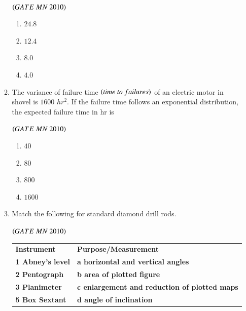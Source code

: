 \documentclass{article}
\begin{document}
\begin{enumerate}[label=Q.\arabic*., itemsep=1em, leftmargin=0pt, itemindent=*, labelsep=0.5em]
\begin{enumerate}[label=Q.\arabic*., start=17, leftmargin=2em]
\\
\begin{flushright}
\hfill$\left(GATE\ MN\ 2010\right)$
\end{flushright}
\begin{multicols}{4}
\begin{enumerate}[label=(\Alph*),leftmargin=4em]
\item $24.8$
\item $12.4$
\item $8.0$
\item $4.0$
\end{enumerate}
\end{multicols}
\bigskip
\item The variance of failure time $\left(time\ to\ failures\right)$ of an electric motor in shovel is $1600$ $hr^2$. If the
failure time follows an exponential distribution, the expected failure time in hr is
\\
\begin{flushright}
\hfill$\left(GATE\ MN\ 2010\right)$
\end{flushright}
\begin{multicols}{4}
\begin{enumerate}[label=(\Alph*),leftmargin=4em]
\item $40$
\item $80$
\item $800$
\item $1600$
\end{enumerate}
\end{multicols}
\bigskip
\item Match the following for standard diamond drill rods.

\vspace{0.5em}
\begin{flushright}
\hfill$\left(GATE\ MN\ 2010\right)$
\end{flushright}
\begin{tabular}{>{\bfseries}l l}
Instrument & \textbf{Purpose/Measurement} \\
1 Abney's level & \textbf{ a horizontal and vertical angles }\\
2 Pentograph & \textbf{ b area of plotted figure }  \\
3 Planimeter & \textbf{c enlargement and reduction of plotted maps  }  \\
5 Box Sextant & \textbf{ d angle of inclination }  \\
\end{tabular}

\vspace{0.5em}


\end{enumerate}
\end{enumerate}
\end{document}
